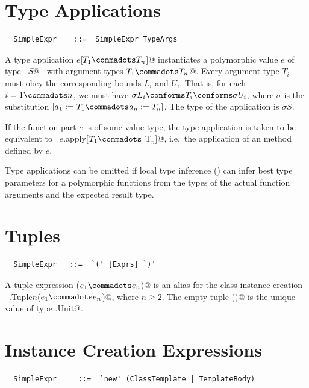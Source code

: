\section{Type Applications}
\label{sec:type-app}
\syntax\begin{lstlisting}
  SimpleExpr    ::=  SimpleExpr TypeArgs
\end{lstlisting}

A type application \lstinline@$e$[$T_1 \commadots T_n$]@ instantiates
a polymorphic value $e$ of type ~\lstinline@[$a_1$ >: $L_1$ <: $U_1
\commadots a_n$ >: $L_n$ <: $U_n$]$S$@~ with argument types
\lstinline@$T_1 \commadots T_n$@.  Every argument type $T_i$ must obey
the corresponding bounds $L_i$ and $U_i$.  That is, for each $i = 1
\commadots n$, we must have $\sigma L_i \conforms T_i \conforms \sigma
U_i$, where $\sigma$ is the substitution $[a_1 := T_1 \commadots a_n
:= T_n]$.  The type of the application is $\sigma S$.

If the function part $e$ is of some value type, the type application
is taken to be equivalent to 
~\lstinline@$e$.apply[$T_1 \commadots$ T$_n$]@, i.e.\ the application of an  method defined by
$e$.

Type applications can be omitted if local type inference
() can infer best type parameters for a
polymorphic functions from the types of the actual function arguments
and the expected result type.

\section{Tuples}
\label{sec:tuples}

\syntax\begin{lstlisting}
  SimpleExpr   ::=  `(' [Exprs] `)'
\end{lstlisting}

A tuple expression \lstinline@($e_1 \commadots e_n$)@ is an alias
for the class instance creation 
~\lstinline@scala.Tuple$n$($e_1 \commadots e_n$)@, where $n \geq 2$.  
The empty tuple
\lstinline@()@ is the unique value of type \lstinline@scala.Unit@.

\section{Instance Creation Expressions}
\label{sec:inst-creation}

\syntax\begin{lstlisting}
  SimpleExpr     ::=  `new' (ClassTemplate | TemplateBody)
\end{lstlisting}

